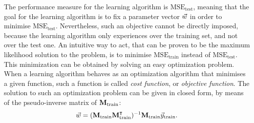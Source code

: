 The performance measure for the learning algorithm is $\mathrm{MSE_{test}}$, meaning that the goal for the learning algorithm is to fix a parameter vector $\vec{w}$ in order to minimise $\mathrm{MSE_{test}}$. Nevertheless, such an objective cannot be directly imposed, because the learning algorithm only experiences over the training set, and not over the test one. An intuitive way to act, that can be proven to be the maximum likelihood solution to the problem, is to minimise  $\mathrm{MSE_{train}}$ instead of $\mathrm{MSE_{test}}$. This minimization can be obtained by solving an easy optimization problem. When a learning algorithm behaves as an optimization algorithm that minimises a given function, such a function is called \emph{cost function}, or \emph{objective function}. 
The solution to such an optimization problem can be given in closed form, by means of the pseudo-inverse matrix of $\textbf{M}_{\text{train}}$:
\begin{equation}
\vec{w} = (\textbf{M}_{\text{train}}\textbf{M}_{\text{train}}^\intercal)^{-1}\textbf{M}_{\text{train}}\vec{y}_{\text{train}}.
\end{equation}

